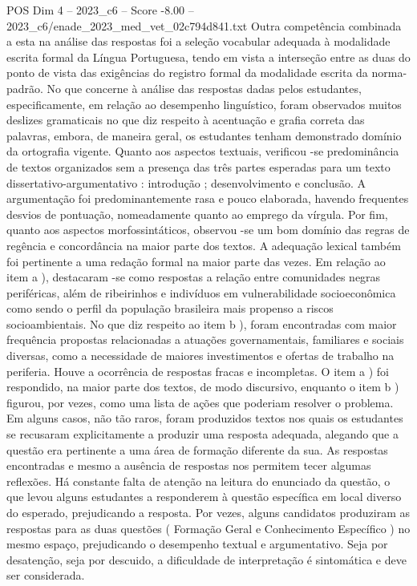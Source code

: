 \begin{textsample}{POS Dim 4 – 2023\_c6 – Score -8.00 – 2023\_c6/enade\_2023\_med\_vet\_02c794d841.txt}
Outra competência combinada a esta na análise das respostas foi a seleção vocabular adequada à modalidade escrita formal da Língua Portuguesa, tendo em vista a interseção entre as duas do ponto de vista das exigências do registro formal da modalidade escrita da norma-padrão.
No que concerne à análise das respostas dadas pelos estudantes, especificamente, em relação ao desempenho linguístico, foram observados muitos deslizes gramaticais no que diz respeito à acentuação e grafia correta das palavras, embora, de maneira geral, os estudantes tenham demonstrado domínio da ortografia vigente.
Quanto aos aspectos textuais, verificou -se predominância de textos organizados sem a presença das três partes esperadas para um texto dissertativo-argumentativo : introdução ; desenvolvimento e conclusão.
A argumentação foi predominantemente rasa e pouco elaborada, havendo frequentes desvios de pontuação, nomeadamente quanto ao emprego da vírgula.
Por fim, quanto aos aspectos morfossintáticos, observou -se um bom domínio das regras de regência e concordância na maior parte dos textos.
A adequação lexical também foi pertinente a uma redação formal na maior parte das vezes.
Em relação ao item a ), destacaram -se como respostas a relação entre comunidades negras periféricas, além de ribeirinhos e indivíduos em vulnerabilidade socioeconômica como sendo o perfil da população brasileira mais propenso a riscos socioambientais.
No que diz respeito ao item b ), foram encontradas com maior frequência propostas relacionadas a atuações governamentais, familiares e sociais diversas, como a necessidade de maiores investimentos e ofertas de trabalho na periferia.
Houve a ocorrência de respostas fracas e incompletas.
O item a ) foi respondido, na maior parte dos textos, de modo discursivo, enquanto o item b ) figurou, por vezes, como uma lista de ações que poderiam resolver o problema.
Em alguns casos, não tão raros, foram produzidos textos nos quais os estudantes se recusaram explicitamente a produzir uma resposta adequada, alegando que a questão era pertinente a uma área de formação diferente da sua.
As respostas encontradas e mesmo a ausência de respostas nos permitem tecer algumas reflexões.
Há constante falta de atenção na leitura do enunciado da questão, o que levou alguns estudantes a responderem à questão específica em local diverso do esperado, prejudicando a resposta.
Por vezes, alguns candidatos produziram as respostas para as duas questões ( Formação Geral e Conhecimento Específico ) no mesmo espaço, prejudicando o desempenho textual e argumentativo.
Seja por desatenção, seja por descuido, a dificuldade de interpretação é sintomática e deve ser considerada.

\end{textsample}
